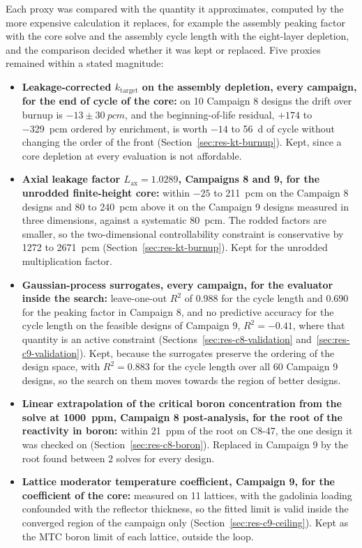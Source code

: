 Each proxy was compared with the quantity it approximates, computed by
the more expensive calculation it replaces, for example the assembly
peaking factor with the core solve and the assembly cycle length with
the eight-layer depletion, and the comparison decided whether it was
kept or replaced. Five proxies remained within a stated magnitude:

\begin{itemize}
  \item \textbf{Leakage-corrected $k_\mathrm{target}$ on the assembly
        depletion, every campaign, for the end of cycle of the core:}
        on 10 Campaign 8 designs the drift over burnup is
        $-13 \pm \SI{30}{pcm}$, and the beginning-of-life residual,
        $+174$ to \SI{-329}{pcm} ordered by enrichment, is worth $-14$
        to \SI{+56}{d} of cycle without changing the order of the front
        (Section~\ref{sec:res-kt-burnup}). Kept, since a core depletion
        at every evaluation is not affordable.
  \item \textbf{Axial leakage factor $L_\mathrm{ax} = 1.0289$,
        Campaigns 8 and 9, for the unrodded finite-height core:} within
        $-25$ to \SI{+211}{pcm} on the Campaign 8 designs and 80 to
        \SI{240}{pcm} above it on the Campaign 9 designs measured in
        three dimensions, against a
        systematic \SI{80}{pcm}. The rodded factors are smaller, so the
        two-dimensional controllability constraint is conservative by
        1272 to \SI{2671}{pcm} (Section~\ref{sec:res-kt-burnup}). Kept
        for the unrodded multiplication factor.
  \item \textbf{Gaussian-process surrogates, every campaign, for the
        evaluator inside the search:} leave-one-out $R^2$ of 0.988 for
        the cycle length and 0.690 for the peaking factor in
        Campaign 8, and no predictive accuracy for the cycle length on
        the feasible designs of Campaign 9, $R^2 = -0.41$, where that
        quantity is an active constraint
        (Sections~\ref{sec:res-c8-validation}
        and~\ref{sec:res-c9-validation}). Kept, because the surrogates
        preserve the ordering of the design space, with $R^2 = 0.883$
        for the cycle length over all 60 Campaign 9 designs, so the
        search on them moves towards the region of better designs. 
  \item \textbf{Linear extrapolation of the critical boron
        concentration from the solve at \SI{1000}{ppm}, Campaign 8
        post-analysis, for the root of the reactivity in boron:} within
        \SI{21}{ppm} of the root on C8-47, the one design it was
        checked on (Section~\ref{sec:res-c8-boron}). Replaced in
        Campaign 9 by the root found between 2 solves for every design.
  \item \textbf{Lattice moderator temperature coefficient, Campaign 9,
        for the coefficient of the core:} measured on 11 lattices, with
        the gadolinia loading confounded with the reflector thickness,
        so the fitted limit is valid inside the converged region of the
        campaign only (Section~\ref{sec:res-c9-ceiling}). Kept as the
        MTC boron limit of each lattice, outside the loop.
\end{itemize}

